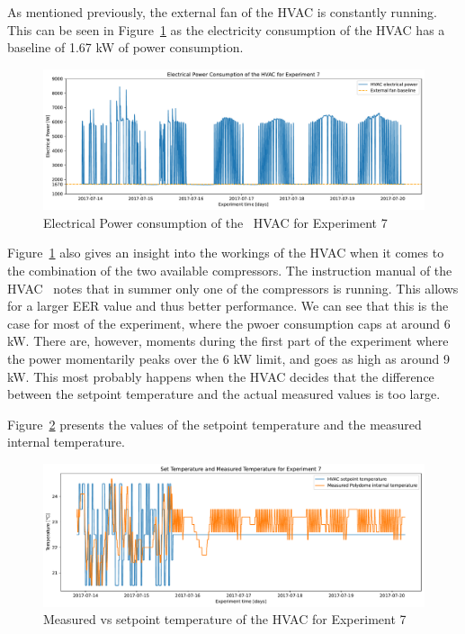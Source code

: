 \clearpage

As mentioned previously, the external fan of the HVAC is constantly running.
This can be seen in Figure~\ref{fig:Polydome_electricity} as the electricity
consumption of the HVAC has a baseline of 1.67 kW of power consumption.

\begin{figure}[ht]
    \centering
    \includegraphics[width = \textwidth]{Plots/Fan_baseline.pdf}
    \caption{Electrical Power consumption of the \pdome\ HVAC for Experiment 7}
    \label{fig:Polydome_electricity}
\end{figure}

Figure~\ref{fig:Polydome_electricity} also gives an insight into the workings of
the HVAC when it comes to the combination of the two available compressors. The
instruction manual of the HVAC~\cite{aermecRoofTopManuelSelection} notes that in
summer only one of the compressors is running. This allows for a larger EER
value and thus better performance. We can see that this is the case for most of
the experiment, where the pwoer consumption caps at around 6 kW. There are,
however, moments during the first part of the experiment where the power
momentarily peaks over the 6 kW limit, and goes as high as around 9 kW. This
most probably happens when the HVAC decides that the difference between the
setpoint temperature and the actual measured values is too large.

Figure~\ref{fig:Polydome_exp7_settemp} presents the values of the setpoint
temperature and the measured internal temperature. 

\begin{figure}[ht]
    \centering
    \includegraphics[width = \textwidth]{Plots/Exp_settemp.pdf}
    \caption{Measured vs setpoint temperature of the HVAC for Experiment 7}
    \label{fig:Polydome_exp7_settemp}
\end{figure}


